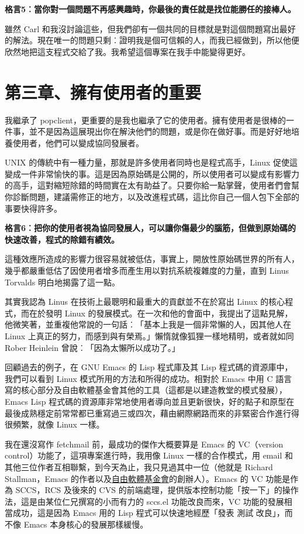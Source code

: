 \documentclass[12pt,]{article}
\makeatletter
\newcommand*{\shifttext}[2]{%
  \settowidth{\@tempdima}{#2}%
  \makebox[\@tempdima]{\hspace*{#1}#2}%
}
\makeatother
\begin{document}
\textbf{格言5︰當你對一個問題不再感興趣時，你最後的責任就是找位能勝任的接棒人。}

雖然 Carl
和我沒討論這些，但我們卻有一個共同的目標就是對這個問題寫出最好的解法。現在唯一的問題只剩︰證明我是個可信賴的人，而我已經做到，所以他便欣然地把這支程式交給了我。我希望這個專案在我手中能變得更好。

\newpage
\section{第三章、擁有使用者的重要}

我繼承了
popclient，更重要的是我也繼承了它的使用者。擁有使用者是很棒的一件事，並不是因為這展現出你在解決他們的問題，或是你在做好事。而是好好地培養使用者，他們可以變成協同發展者。

UNIX 的傳統中有一種力量，那就是許多使用者同時也是程式高手，Linux
促使這變成一件非常愉快的事。這是因為原始碼是公開的，所以使用者可以變成有影響力的高手，這對縮短除錯的時間實在太有助益了。只要你給一點掌聲，使用者們會幫你診斷問題，建議需修正的地方，以及改進程式碼，這比你自己一個人包下全部的事要快得許多。

\textbf{格言6︰把你的使用者視為協同發展人，可以讓你傷最少的腦筋，但做到原始碼的快速改善，程式的除錯有績效。}

這種效應所造成的影響力很容易就被低估，事實上，開放性原始碼世界的所有人，幾乎都嚴重低估了因使用者增多而產生用以對抗系統複雜度的力量，直到
Linus Torvalds 明白地揭露了這一點。

其實我認為 Linus 在技術上最聰明和最重大的貢獻並不在於寫出 Linux
的核心程式，而在於發明 Linux
的發展模式。在一次和他的會面中，我提出了這點見解，他微笑著，並重複他常說的一句話︰「基本上我是一個非常懶的人，因其他人在
Linux 上真正的努力，而感到與有榮焉。」懶惰就像狐狸一樣地精明，或者就如同
Rober Heinlein 曾說︰「因為太懶所以成功了。」

回顧過去的例子，在 GNU Emacs 的 Lisp 程式庫及其 Lisp
程式碼的資源庫中，我們可以看到 Linux 模式所用的方法和所得的成功。相對於
Emacs 中用 C
語言寫的核心部分及自由軟體基金會其他的工具（這都是以建造教堂的模式發展），Emacs
Lisp
程式碼的資源庫非常地使用者導向並且更新很快，好的點子和原型在最後成熟穩定前常常都已重寫過三或四次，藉由網際網路而來的非緊密合作進行得很頻繁，就像
Linux 一樣。

我在還沒寫作 fetchmail 前，最成功的傑作大概要算是 Emacs 的 VC（version
control）功能了，這項專案進行時，我用像 Linux 一樣的合作模式，用 email
和其他三位作者互相聯繫，到今天為止，我只見過其中一位（他就是 Richard
Stallman，Emacs
的作者以及\href{http://www.fsf.org}{自由軟體基金會}的創辦人）。Emacs 的
VC 功能是作為 SCCS，RCS 及後來的 CVS
的前端處理，提供版本控制功能「按一下」的操作法，這是由某位仁兄撰寫的小而有力的
sccs.el 功能改良而來，VC 功能的發展相當成功，這是因為 Emacs 用的 Lisp
程式可以快速地經歷「發表 \shifttext{1pt}{---}\shifttext{-1pt}{---} 測試 \shifttext{1pt}{---}\shifttext{-1pt}{---} 改良」，而不像 Emacs
本身核心的發展那樣緩慢。
\end{document}
